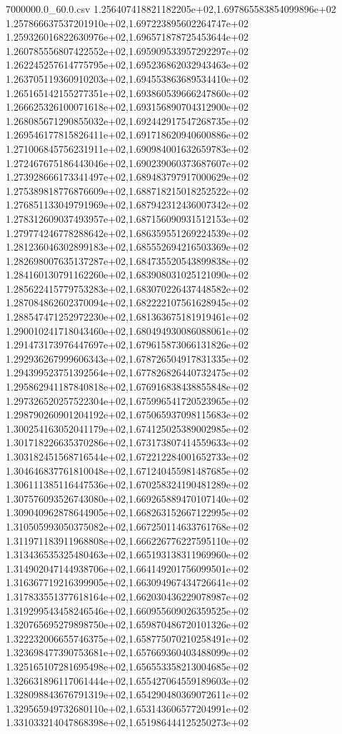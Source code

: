 \begin{filecontents*}{7000000.0_60.0.csv}
1.256407418821182205e+02,1.697865583854099896e+02
1.257866637537201910e+02,1.697223895602264747e+02
1.259326016822630976e+02,1.696571878725453644e+02
1.260785556807422552e+02,1.695909533957292297e+02
1.262245257614775795e+02,1.695236862032943463e+02
1.263705119360910203e+02,1.694553863689534410e+02
1.265165142155277351e+02,1.693860539666247860e+02
1.266625326100071618e+02,1.693156890704312900e+02
1.268085671290855032e+02,1.692442917547268735e+02
1.269546177815826411e+02,1.691718620940600886e+02
1.271006845756231911e+02,1.690984001632659783e+02
1.272467675186443046e+02,1.690239060373687607e+02
1.273928666173341497e+02,1.689483797917000629e+02
1.275389818776876609e+02,1.688718215018252522e+02
1.276851133049791969e+02,1.687942312436007342e+02
1.278312609037493957e+02,1.687156090931512153e+02
1.279774246778288642e+02,1.686359551269224539e+02
1.281236046302899183e+02,1.685552694216503369e+02
1.282698007635137287e+02,1.684735520543899838e+02
1.284160130791162260e+02,1.683908031025121090e+02
1.285622415779753283e+02,1.683070226437448582e+02
1.287084862602370094e+02,1.682222107561628945e+02
1.288547471252972230e+02,1.681363675181919461e+02
1.290010241718043460e+02,1.680494930086088061e+02
1.291473173976447697e+02,1.679615873066131826e+02
1.292936267999606343e+02,1.678726504917831335e+02
1.294399523751392564e+02,1.677826826440732475e+02
1.295862941187840818e+02,1.676916838438855848e+02
1.297326520257522304e+02,1.675996541720523965e+02
1.298790260901204192e+02,1.675065937098115683e+02
1.300254163052041179e+02,1.674125025389002985e+02
1.301718226635370286e+02,1.673173807414559633e+02
1.303182451568716544e+02,1.672212284001652733e+02
1.304646837761810048e+02,1.671240455981487685e+02
1.306111385116447536e+02,1.670258324190481289e+02
1.307576093526743080e+02,1.669265889470107140e+02
1.309040962878644905e+02,1.668263152667122995e+02
1.310505993050375082e+02,1.667250114633761768e+02
1.311971183911968808e+02,1.666226776227595110e+02
1.313436535325480463e+02,1.665193138311969960e+02
1.314902047144938706e+02,1.664149201756099501e+02
1.316367719216399905e+02,1.663094967434726641e+02
1.317833551377618164e+02,1.662030436229078987e+02
1.319299543458246546e+02,1.660955609026359525e+02
1.320765695279898750e+02,1.659870486720101326e+02
1.322232006655746375e+02,1.658775070210258491e+02
1.323698477390753681e+02,1.657669360403488099e+02
1.325165107281695498e+02,1.656553358213004685e+02
1.326631896117061444e+02,1.655427064559189603e+02
1.328098843676791319e+02,1.654290480369072611e+02
1.329565949732680110e+02,1.653143606577204991e+02
1.331033214047868398e+02,1.651986444125250273e+02

\end{filecontents*}
